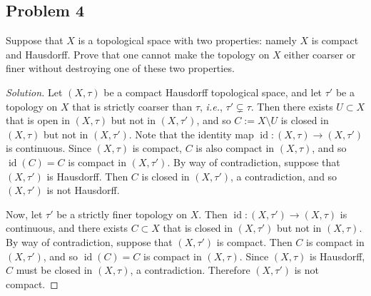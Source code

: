 \documentclass[12pt]{article}
\newcommand{\ita}[1]{\textit{#1}}
\theoremstyle{definition}
\DeclareMathOperator\id{id}
\begin{document}
\subsection{Problem 4 \texorpdfstring{\cite{Scott}}{}}
Suppose that $X$ is a topological space with two properties: namely $X$ is compact and Hausdorff. Prove that one cannot make the topology on $X$ either coarser or finer without destroying one of these two properties.
\begin{proof}[Solution]
    Let $(X,\tau)$ be a compact Hausdorff topological space, and let $\tau'$ be a topology on $X$ that is strictly coarser than $\tau$, \ita{i.e.}, $\tau' \subsetneq \tau$. Then there exists $U \subset X$ that is open in $(X,\tau)$ but not in $(X,\tau')$, and so $C := X \setminus U$ is closed in $(X,\tau)$ but not in $(X,\tau')$. Note that the identity map $\id : (X,\tau) \to (X,\tau')$ is continuous. Since $(X,\tau)$ is compact, $C$ is also compact in $(X,\tau)$, and so $\id(C) = C$ is compact in $(X,\tau')$. By way of contradiction, suppose that $(X,\tau')$ is Hausdorff. Then $C$ is closed in $(X,\tau')$, a contradiction, and so $(X,\tau')$ is not Hausdorff.
    
    Now, let $\tau'$ be a strictly finer topology on $X$. Then $\id : (X,\tau') \to (X,\tau)$ is continuous, and there exists $C \subset X$ that is closed in $(X,\tau')$ but not in $(X,\tau)$. By way of contradiction, suppose that $(X,\tau')$ is compact. Then $C$ is compact in $(X,\tau')$, and so $\id(C) = C$ is compact in $(X,\tau)$. Since $(X,\tau)$ is Hausdorff, $C$ must be closed in $(X,\tau)$, a contradiction. Therefore $(X,\tau')$ is not compact.
\end{proof}
\end{document}
